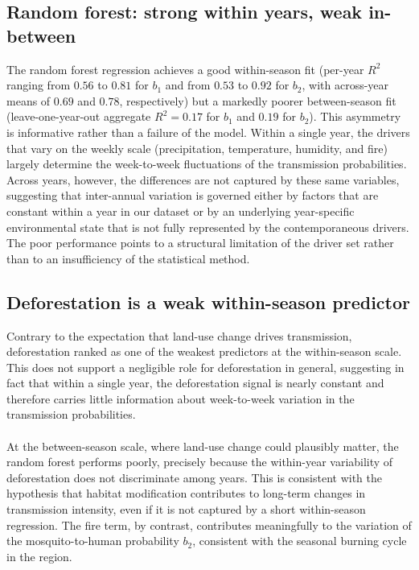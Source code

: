 \documentclass[a4paper,fleqn]{cas-dc}
\begin{document}
\subsection{Random forest: strong within years, weak in-between}

The random forest regression achieves a good within-season fit
(per-year $R^2$ ranging from $0.56$ to $0.81$ for $b_1$ and from $0.53$ to
$0.92$ for $b_2$, with across-year means of $0.69$ and $0.78$,
respectively) but a markedly poorer between-season fit (leave-one-year-out
aggregate $R^2 = 0.17$ for $b_1$ and $0.19$ for $b_2$). This asymmetry is informative rather
than a failure of the model. Within a single year, the
drivers that vary on the weekly scale (precipitation, temperature,
humidity, and fire) largely determine the week-to-week fluctuations of
the transmission probabilities. Across years, however, the
differences are not captured by these same variables, suggesting that
inter-annual variation is governed either by factors that are
constant within a year in our dataset or by an underlying year-specific
environmental state that is not fully represented by the contemporaneous
drivers. The poor performance points to a
structural limitation of the driver set rather than to an
insufficiency of the statistical method.

\subsection{Deforestation is a weak within-season predictor}
\label{sec:deforestation_as_a_weak_predictor}

Contrary to the expectation that land-use change drives transmission,
deforestation ranked as one of the weakest predictors at the
within-season scale. This does not support a negligible role for
deforestation in general, suggesting in fact that within a single
year, the deforestation signal is nearly constant and therefore
carries little information about week-to-week variation in the
transmission probabilities. 
\\\\
At the between-season scale, where land-use
change could plausibly matter, the random forest performs poorly,
precisely because the within-year variability of deforestation does
not discriminate among years. This is consistent with the hypothesis
that habitat modification contributes to long-term changes in
transmission intensity, even if it is not captured by a short
within-season regression. The fire term, by contrast, contributes
meaningfully to the variation of the mosquito-to-human probability
$b_2$, consistent with the seasonal burning cycle in the region.
\end{document}
